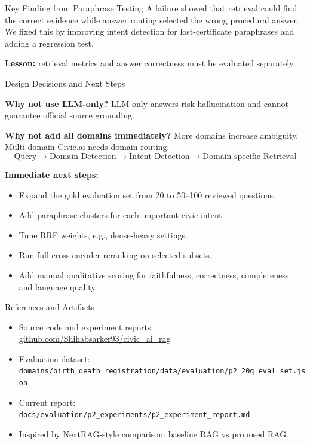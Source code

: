 \documentclass[final]{beamer}
\newlength{\colwidth}
\begin{document}
\begin{frame}[t]
\begin{columns}[t]
\begin{column}{\colwidth}
\begin{alertblock}{Key Finding from Paraphrase Testing}
    A failure showed that retrieval could find the correct evidence while
    answer routing selected the wrong procedural answer. We fixed this by
    improving intent detection for lost-certificate paraphrases and adding a
    regression test.

    \vspace{0.3em}
    \textbf{Lesson:} retrieval metrics and answer correctness must be evaluated
    separately.

  \end{alertblock}

  \begin{block}{Design Decisions and Next Steps}

    \textbf{Why not use LLM-only?}
    LLM-only answers risk hallucination and cannot guarantee official source
    grounding.

    \textbf{Why not add all domains immediately?}
    More domains increase ambiguity. Multi-domain Civic.ai needs domain routing:
    \[
      \text{Query} \rightarrow \text{Domain Detection} \rightarrow
      \text{Intent Detection} \rightarrow \text{Domain-specific Retrieval}
    \]

    \textbf{Immediate next steps:}
    \begin{itemize}
      \item Expand the gold evaluation set from 20 to 50--100 reviewed
        questions.
      \item Add paraphrase clusters for each important civic intent.
      \item Tune RRF weights, e.g., dense-heavy settings.
      \item Run full cross-encoder reranking on selected subsets.
      \item Add manual qualitative scoring for faithfulness, correctness,
        completeness, and language quality.
    \end{itemize}

  \end{block}

  \begin{block}{References and Artifacts}

    \small
    \begin{itemize}
      \item Source code and experiment reports:
      \href{https://github.com/Shihabsarker93/civic_ai_rag}{github.com/Shihabsarker93/civic\_ai\_rag}
      \item Evaluation dataset:
      \texttt{domains/birth\_death\_registration/data/evaluation/p2\_20q\_eval\_set.json}
      \item Current report:
      \texttt{docs/evaluation/p2\_experiments/p2\_experiment\_report.md}
      \item Inspired by NextRAG-style comparison: baseline RAG vs proposed RAG.
    \end{itemize}


\end{block}
\end{column}
\end{columns}
\end{frame}
\end{document}

